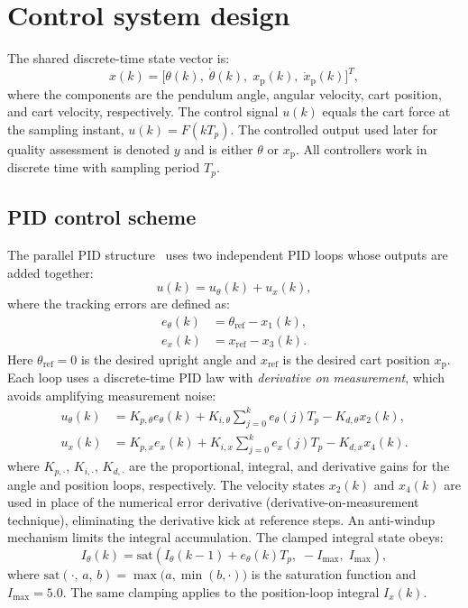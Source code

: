 \documentclass[twocolumn]{svjour3}
\begin{document}
    \section{Control system design}
	\label{sec:r}
    The shared discrete-time state vector is:
\begin{equation}
x(k)=\bigl[\theta(k),\;\dot{\theta}(k),\;x_\mathrm{p}(k),\;\dot{x}_\mathrm{p}(k)\bigr]^T,
\label{eq:state_vec}
\end{equation}
where the components are the pendulum angle, angular velocity, cart position, and cart
velocity, respectively. The control signal $u(k)$ equals the cart force at the sampling
instant, $u(k)=F(kT_p)$. The controlled output used later for quality assessment is denoted
$y$ and is either $\theta$ or $x_\mathrm{p}$. All controllers work in discrete time with
sampling period $T_p$.

\subsection{PID control scheme}
The parallel PID structure~\cite{Prasad2014} uses two independent PID loops whose outputs are
added together:
\begin{equation}
u(k) = u_{\theta}(k) + u_{x}(k),
\end{equation}
where the tracking errors are defined as:
\begin{align}
e_{\theta}(k) &= \theta_\mathrm{ref} - x_1(k), \label{eq:err_theta}\\
e_x(k) &= x_\mathrm{ref} - x_3(k). \label{eq:err_x}
\end{align}
Here $\theta_\mathrm{ref}=0$ is the desired upright angle and $x_\mathrm{ref}$ is the desired
cart position $x_\mathrm{p}$.
Each loop uses a discrete-time PID law with \emph{derivative on measurement}, which avoids
amplifying measurement noise:
\begin{align}
u_{\theta}(k) &= K_{p,\theta}e_{\theta}(k) + K_{i,\theta}\!\sum_{j=0}^{k}\!e_{\theta}(j)T_p
               - K_{d,\theta}x_2(k),\label{eq:pid_theta}\\
u_{x}(k) &= K_{p,x}e_x(k) + K_{i,x}\!\sum_{j=0}^{k}\!e_x(j)T_p
           - K_{d,x}x_4(k).\label{eq:pid_x}
\end{align}
where $K_{p,\cdot}$, $K_{i,\cdot}$, $K_{d,\cdot}$ are the proportional, integral, and
derivative gains for the angle and position loops, respectively. The velocity states
$x_2(k)$ and $x_4(k)$ are used in place of the numerical error derivative
(derivative-on-measurement technique), eliminating the derivative kick at reference steps.
An anti-windup mechanism limits the integral accumulation. The clamped integral state obeys:
\begin{equation}
I_{\theta}(k) = \mathrm{sat}\!\left(I_{\theta}(k{-}1)+e_{\theta}(k)T_p,\;-I_{\max},\;I_{\max}\right),
\label{eq:antiwindup}
\end{equation}
where $\mathrm{sat}(\cdot,\,a,\,b)=\max\!\bigl(a,\min(b,\cdot)\bigr)$ is the saturation
function and $I_{\max}=5.0$. The same clamping applies to the position-loop integral
$I_x(k)$.
\end{document}
